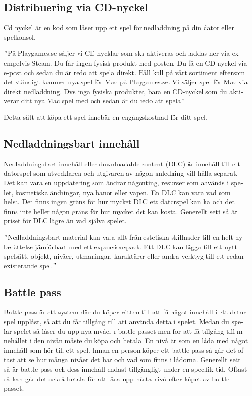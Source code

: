 \documentclass[11p]{article}
\begin{document}
\begin{otherlanguage}{swedish}
    \subsection{Distribuering via CD-nyckel}
    Cd nyckel är en kod som låser upp ett spel för nedladdning på din dator eller spelkonsol.

    \setlength{\leftskip}{1cm}
    \("\)På Playgames.se säljer vi CD-nycklar som ska aktiveras och laddas ner via exempelvis Steam.
    Du får ingen fysisk produkt med posten.
    Du få en CD-nyckel via e-post och sedan du är redo att spela direkt.
    Håll koll på vårt sortiment eftersom det ständigt kommer nya spel för Mac på Playgames.se.
    Vi säljer spel för Mac via direkt nedladdning.
    Dvs inga fysiska produkter, bara en CD-nyckel som du aktiverar ditt nya Mac spel med och sedan är du redo att spela\("\)\parencite{playgames}

    \setlength{\leftskip}{0cm}
    Detta sätt att köpa ett spel innebär en engångskostnad för ditt spel.

    \subsection{Nedladdningsbart innehåll}
    Nedladdningsbart innehåll eller downloadable content (DLC) är innehåll till ett datorspel som utvecklaren och utgivaren av någon anledning vill hålla separat.
    Det kan vara en uppdatering som ändrar någonting, resurser som används i spelet, kosmetiska ändringar, nya banor eller vapen.
    En DLC kan vara vad som helst.
    Det finns ingen gräns för hur mycket DLC ett datorspel kan ha och det finns inte heller någon gräns för hur mycket det kan kosta.
    Generellt sett så är priset för DLC lägre än vad själva spelet.

    \setlength{\leftskip}{1cm}

    \("\)Nedladdningsbart material kan vara allt från estetiska skillnader till en helt ny berättelse jämförbart med ett expansionspack.
    Ett DLC kan lägga till ett nytt spelsätt, objekt, nivåer, utmaningar, karaktärer eller andra verktyg till ett redan existerande spel.\("\) \parencite{nedladdningsbart}

    \setlength{\leftskip}{0cm}

    \subsection{Battle pass}

    Battle pass är ett system där du köper rätten till att få något innehåll i ett datorspel upplåst, så att du får tillgång till att använda detta i spelet.
    Medan du spelar spelet så låser du upp nya nivåer i battle passet men för att få tillgång till innehållet i den nivån måste du köpa och betala.
    En nivå är som en låda med något innehåll som hör till ett spel.
    Innan en person köper ett battle pass så går det oftast att se hur många nivåer det har och vad som finns i lådorna.
    Generellt sett så är battle pass och dess innehåll endast tillgängligt under en specifik tid.
    Oftast så kan går det också betala för att låsa upp nästa nivå efter köpet av battle passet.


\end{otherlanguage}
\end{document}
